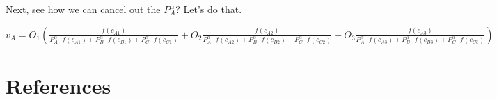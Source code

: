 \documentclass[]{elsarticle} %
\begin{document}
Next, see how we can cancel out the \(P_{A}^\alpha\)? Let's do that.

\(v_{A} = O_1(\frac{f(c_{A1})}{P_{A}^\alpha \cdot f(c_{A1}) + P_{B}^\alpha \cdot f(c_{B1}) + P_{C}^\alpha \cdot f(c_{C1})} + O_2\frac{f(c_{A2})}{P_{A}^\alpha \cdot f(c_{A2}) + P_{B}^\alpha \cdot f(c_{B2}) + P_{C}^\alpha \cdot f(c_{C2})} + O_3\frac{f(c_{A3})}{P_{A}^\alpha \cdot f(c_{A3}) + P_{B}^\alpha \cdot f(c_{B3}) + P_{C}^\alpha \cdot f(c_{C3})} )\)

\newpage

\hypertarget{references}{%
\section*{References}\label{references}}


\end{document}
